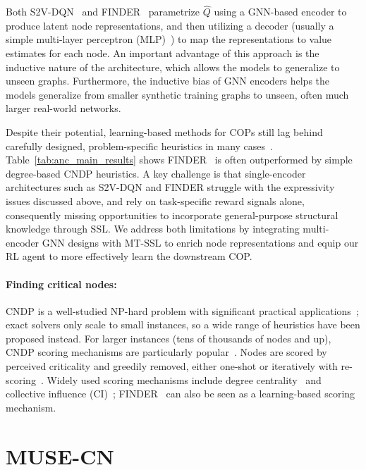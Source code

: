 \documentclass{article}
\begin{document}
Both S2V-DQN~\cite{khalil2017learning} and FINDER~\cite{fan2020finding} parametrize $\hat{Q}$ using a GNN-based encoder to produce latent node representations, and then utilizing a decoder (usually a simple multi-layer perceptron (MLP)~\cite{ramchoun2016multilayer}) to map the representations to value estimates for each node. An important advantage of this approach is the inductive nature of the architecture, which allows the models to generalize to unseen graphs. Furthermore, the inductive bias of GNN encoders helps the models generalize from smaller synthetic training graphs to unseen, often much larger real-world networks.


Despite their potential, learning-based methods for COPs still lag behind carefully designed, problem-specific heuristics in many cases~\cite{joshi2021learning}. Table~\ref{tab:anc_main_results} shows FINDER~\cite{fan2020finding} is often outperformed by simple degree-based CNDP heuristics. A key challenge is that single-encoder architectures such as S2V-DQN and FINDER struggle with the expressivity issues discussed above, and rely on task-specific reward signals alone, consequently missing opportunities to incorporate general-purpose structural knowledge through SSL. We address both limitations by integrating multi-encoder GNN designs with MT-SSL to enrich node representations and equip our RL agent to more effectively learn the downstream COP.


\paragraph{Finding critical nodes:} CNDP is a well-studied NP-hard problem with significant practical applications~\cite{lalou2018critical}; exact solvers only scale to small instances, so a wide range of heuristics have been proposed instead. For larger instances (tens of thousands of nodes and up), CNDP scoring mechanisms are particularly popular~\cite{fan2020finding,morone2016collective,pastor2001epidemic}. Nodes are scored by perceived criticality and greedily removed, either one-shot or iteratively with re-scoring~\cite{fan2020finding}. Widely used scoring mechanisms include degree centrality~\cite{zhang2017degree} and collective influence (CI)~\cite{morone2016collective}; FINDER~\cite{fan2020finding} can also be seen as a learning-based scoring mechanism.



\section{MUSE-CN}
\label{sec:muse_cn}
\end{document}

